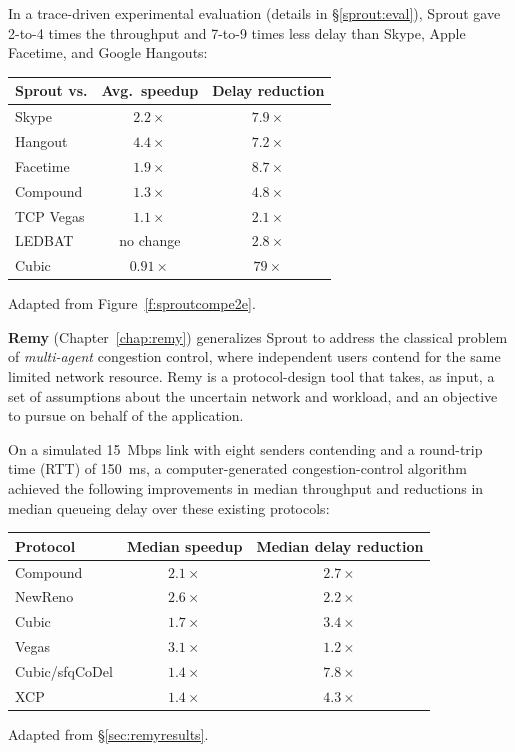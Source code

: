 In a trace-driven experimental evaluation (details in
\S\ref{sprout:eval}), Sprout gave 2-to-4 times the throughput and
7-to-9 times less delay than Skype, Apple Facetime, and Google
Hangouts:

\begin{center}
\noindent \begin{tabular}{|l|c|c|}
\hline
Sprout vs. & Avg.~speedup & Delay reduction \\
\hline
\hline
Skype & $2.2\times$ & $7.9\times$\\
Hangout & $4.4\times$ & $7.2\times$\\
Facetime & $1.9\times$ & $8.7\times$\\
\hline
Compound & $1.3\times$ & $4.8\times$\\
TCP Vegas & $1.1\times$ & $2.1\times$\\
LEDBAT & no change & $2.8\times$\\
Cubic & \cellcolor{red!20}$0.91\times$ & $79\times$\\
\hline
\end{tabular}

{\footnotesize Adapted from Figure~\ref{f:sproutcompe2e}.}

\end{center}

\textbf{Remy} (Chapter~\ref{chap:remy}) generalizes Sprout to address
the classical problem of \emph{multi-agent} congestion control, where
independent users contend for the same limited network resource. Remy
is a protocol-design tool that takes, as input, a set of assumptions
about the uncertain network and workload, and an objective to pursue
on behalf of the application.

On a simulated 15~Mbps link with eight senders contending and a
round-trip time (RTT) of 150~ms, a computer-generated
congestion-control algorithm achieved the following improvements in
median throughput and reductions in median queueing delay over these
existing protocols:

\begin{center}

\begin{tabular}{|l|c|c|}
\hline
Protocol & Median speedup & Median delay reduction \\
\hline
\hline
Compound & $2.1\times$ & $2.7\times$ \\
NewReno & $2.6\times$ & $2.2\times$ \\
Cubic & $1.7\times$ & $3.4\times$ \\
Vegas & $3.1\times$ & $1.2\times$ \\
\hline
Cubic/sfqCoDel & $1.4\times$ & $7.8\times$ \\
XCP & $1.4\times$ & $4.3\times$ \\
\hline
\end{tabular}

{\footnotesize Adapted from \S\ref{sec:remyresults}.}

\end{center}

